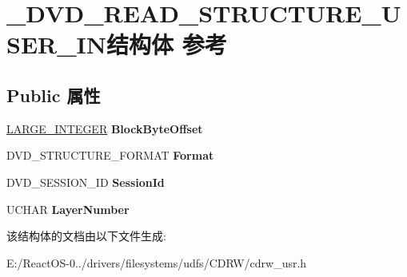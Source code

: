 \hypertarget{struct___d_v_d___r_e_a_d___s_t_r_u_c_t_u_r_e___u_s_e_r___i_n}{}\section{\+\_\+\+D\+V\+D\+\_\+\+R\+E\+A\+D\+\_\+\+S\+T\+R\+U\+C\+T\+U\+R\+E\+\_\+\+U\+S\+E\+R\+\_\+\+I\+N结构体 参考}
\label{struct___d_v_d___r_e_a_d___s_t_r_u_c_t_u_r_e___u_s_e_r___i_n}
\subsection*{Public 属性}
\begin{DoxyCompactItemize}
\item 
\mbox{\label{struct___d_v_d___r_e_a_d___s_t_r_u_c_t_u_r_e___u_s_e_r___i_n_a7b48edd814e151d422354f612af517e0}} 
\hyperlink{union___l_a_r_g_e___i_n_t_e_g_e_r}{L\+A\+R\+G\+E\+\_\+\+I\+N\+T\+E\+G\+ER} {\bfseries Block\+Byte\+Offset}
\item 
\mbox{\label{struct___d_v_d___r_e_a_d___s_t_r_u_c_t_u_r_e___u_s_e_r___i_n_aaacf8b214682df1b755ed1b344d74029}} 
D\+V\+D\+\_\+\+S\+T\+R\+U\+C\+T\+U\+R\+E\+\_\+\+F\+O\+R\+M\+AT {\bfseries Format}
\item 
\mbox{\label{struct___d_v_d___r_e_a_d___s_t_r_u_c_t_u_r_e___u_s_e_r___i_n_a025e04d7f9fb7fa7552a27081e576561}} 
D\+V\+D\+\_\+\+S\+E\+S\+S\+I\+O\+N\+\_\+\+ID {\bfseries Session\+Id}
\item 
\mbox{\label{struct___d_v_d___r_e_a_d___s_t_r_u_c_t_u_r_e___u_s_e_r___i_n_ab81f5e83c525dc4b1828f19c58fd4d20}} 
U\+C\+H\+AR {\bfseries Layer\+Number}
\end{DoxyCompactItemize}


该结构体的文档由以下文件生成\+:\begin{DoxyCompactItemize}
\item 
E\+:/\+React\+O\+S-\/0../drivers/filesystems/udfs/\+C\+D\+R\+W/cdrw\+\_\+usr.\+h\end{DoxyCompactItemize}
